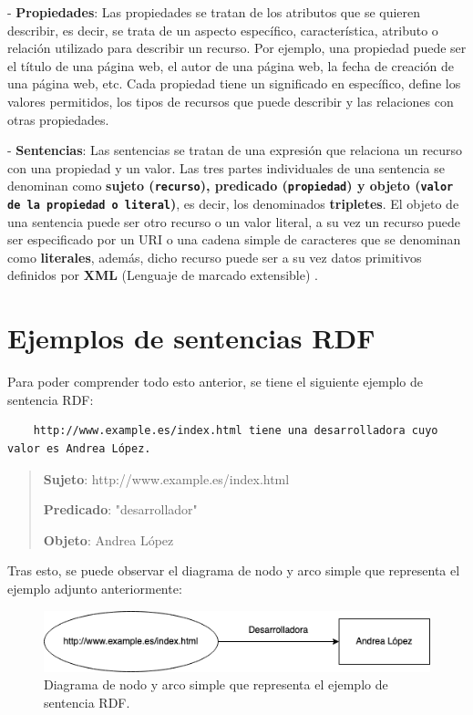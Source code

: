 \documentclass[11pt]{report}
\begin{document}
- \textbf{Propiedades}: Las propiedades se tratan de los atributos que se quieren describir, es decir, se trata de un aspecto específico, característica, atributo o relación utilizado para describir un recurso. Por ejemplo, una propiedad puede ser el título de una página web, el autor de una página web, la fecha de creación de una página web, etc.  Cada propiedad tiene un significado en específico, define los valores permitidos, los tipos de recursos que puede describir y las relaciones con otras propiedades.

- \textbf{Sentencias}: Las sentencias se tratan de una expresión que relaciona un recurso con una propiedad y un valor. Las tres partes individuales de una sentencia se denominan como \textbf{sujeto (\texttt{recurso}), predicado (\texttt{propiedad}) y objeto (\texttt{valor de la propiedad o literal})}, es decir, los denominados \textbf{tripletes}. El objeto de una sentencia puede ser otro recurso o un valor literal, a su vez un recurso puede ser especificado por un URI o una cadena simple de caracteres que se denominan como \textbf{literales}, además, dicho recurso puede ser a su vez datos primitivos definidos por \textbf{XML} (Lenguaje de marcado extensible) \cite{6}.

\section{Ejemplos de sentencias RDF}
Para poder comprender todo esto anterior, se tiene el siguiente ejemplo de sentencia RDF:

\begin{verbatim}
	http://www.example.es/index.html tiene una desarrolladora cuyo valor es Andrea López.
\end{verbatim}

\begin{quote}
	\textbf{Sujeto}: http://www.example.es/index.html

	\textbf{Predicado}: "desarrollador"

	\textbf{Objeto}: Andrea López
\end{quote}

Tras esto, se puede observar el diagrama de nodo y arco simple que representa el ejemplo adjunto anteriormente:

\begin{figure}[H]
	\centering
	\includegraphics[scale=0.7]{../img/Diagrama-Nodo-Arco.png}
	\caption{Diagrama de nodo y arco simple que representa el ejemplo de sentencia RDF.}
	\label{fig:Diagrama-Nodo-Arco}
\end{figure}
\end{document}
